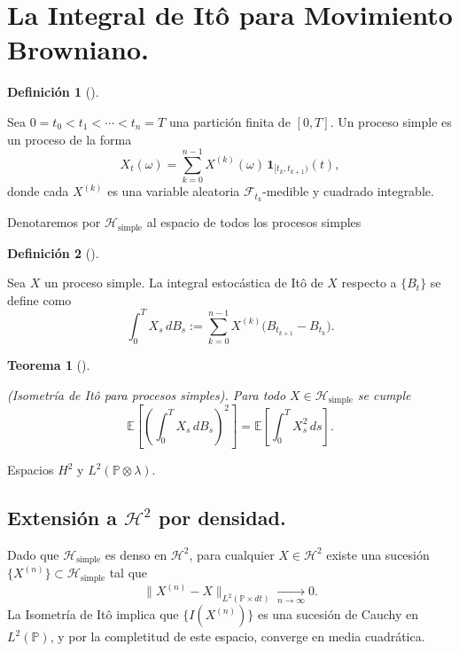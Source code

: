 \documentclass[
  spanish,
  us-letterpaper,
]{scrreprt}
\theoremstyle{plain}
\newtheorem{theorem}{Teorema}[chapter]
\theoremstyle{plain}
\theoremstyle{definition}
\newtheorem{definition}{Definición}[chapter]
\theoremstyle{remark}
\begin{document}
\section{La Integral de Itô para Movimiento Browniano.}\label{sec-Ito}

\begin{definition}[]\protect\hypertarget{def-procesp_Simple}{}\label{def-procesp_Simple}

Sea \(0 = t_0 < t_1 < \cdots < t_n = T\) una partición finita de
\([0,T]\). Un proceso simple es un proceso de la forma
\[X_t(\omega) = \sum_{k=0}^{n-1} X^{(k)}(\omega) \, \mathbf{1}_{[t_k, t_{k+1})}(t),\]
donde cada \(X^{(k)}\) es una variable aleatoria
\(\mathcal{F}_{t_k}\)-medible y cuadrado integrable.

\end{definition}

Denotaremos por \(\mathcal{H}_{\text{simple}}\) al espacio de todos los
procesos simples

\begin{definition}[]\protect\hypertarget{def-int_ito_proc_simples}{}\label{def-int_ito_proc_simples}

Sea \(X\) un proceso simple. La integral estocástica de Itô de \(X\)
respecto a \(\{B_t\}\) se define como
\[\int_0^T X_s \, dB_s := \sum_{k=0}^{n-1} X^{(k)} \bigl( B_{t_{k+1}} - B_{t_k} \bigr).\]

\end{definition}

\begin{theorem}[]\protect\hypertarget{thm-isometria_ito_proc_simples}{}\label{thm-isometria_ito_proc_simples}

(Isometría de Itô para procesos simples). Para todo
\(X \in \mathcal{H}_{\text{simple}}\) se cumple
\[\mathbb{E} \left[ \left( \int_0^T X_s \, dB_s \right)^2 \right] = \mathbb{E} \left[ \int_0^T X_s^2 \, ds \right].\]

\end{theorem}

Espacios \(H^2\) y \(L^2(\mathbb{P} \otimes \lambda)\).

\subsection{\texorpdfstring{Extensión a \(\mathcal{H}^2\) por
densidad.}{Extensión a \textbackslash mathcal\{H\}\^{}2 por densidad.}}\label{extensiuxf3n-a-mathcalh2-por-densidad.}

Dado que \(\mathcal{H}_{\text{simple}}\) es denso en \(\mathcal{H}^2\),
para cualquier \(X \in \mathcal{H}^2\) existe una sucesión
\(\{X^{(n)}\} \subset \mathcal{H}_{\text{simple}}\) tal que
\[\|X^{(n)} - X\|_{L^2(\mathbb{P} \times dt)} \xrightarrow[n \to \infty]{} 0.\]
La Isometría de Itô implica que \(\{I(X^{(n)})\}\) es una sucesión de
Cauchy en \(L^2(\mathbb{P})\), y por la completitud de este espacio,
converge en media cuadrática.
\end{document}
